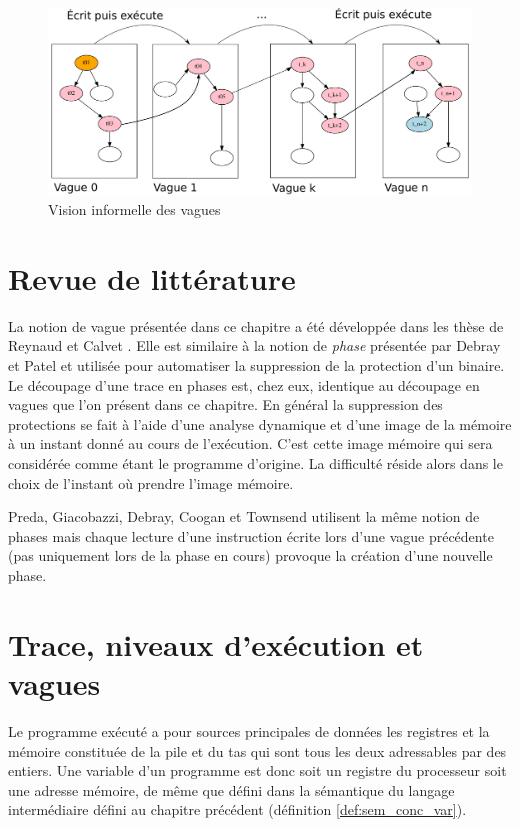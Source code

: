 \begin{figure}
 \includegraphics[width=1.0\textwidth]{supports/automodification/phases2_final.pdf}
 \caption{Vision informelle des vagues}
 \label{fig:vagues_visuel}
\end{figure}


\section{Revue de littérature}
La notion de vague présentée dans ce chapitre a été développée dans les thèse de Reynaud \cite{Reynaud2010} et Calvet \cite{Calvet2013}.
Elle est similaire à la notion de \emph{phase} présentée par Debray et Patel \cite{DP10} et utilisée pour automatiser la suppression de la protection d'un binaire. Le découpage d'une trace en phases est, chez eux, identique au découpage en vagues que l'on présent dans ce chapitre.
En général la suppression des protections se fait à l'aide d'une analyse dynamique et d'une image de la mémoire à un instant donné au cours de l'exécution. C'est cette image mémoire qui sera considérée comme étant le programme d'origine. La difficulté réside alors dans le choix de l'instant où prendre l'image mémoire.

Preda, Giacobazzi, Debray, Coogan et Townsend \cite{PGDCT10} utilisent la même notion de phases mais chaque lecture d'une instruction écrite lors d'une vague précédente (pas uniquement lors de la phase en cours) provoque la création d'une nouvelle phase.


\section{Trace, niveaux d'exécution et vagues}
Le programme exécuté a pour sources principales de données les registres et la mémoire constituée de la pile et du tas qui sont tous les deux adressables par des entiers. Une variable d'un programme est donc soit un registre du processeur soit une adresse mémoire, de même que défini dans la sémantique du langage intermédiaire défini au chapitre précédent (définition \ref{def:sem_conc_var}).

